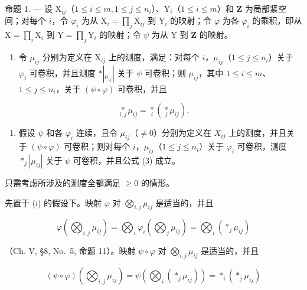 命题 1. --- 设 \(\mathrm{X}_{ij}\)（\(1 \leqslant i \leqslant m, 1 \leqslant j \leqslant n_i\)）、\(\mathrm{Y}_i\)（\(1 \leqslant i \leqslant m\)）和 \(\mathbf{Z}\) 为局部紧空间；对每个 \(i\)，令 \(\varphi_i\) 为从 \(\mathrm{X}_i = \prod_j \mathrm{X}_{ij}\) 到 \(\mathrm{Y}_i\) 的映射；令 \(\varphi\) 为各 \(\varphi_i\) 的乘积，即从 \(\mathrm{X} = \prod_i \mathrm{X}_i\) 到 \(\mathrm{Y} = \prod_j \mathrm{Y}_i\) 的映射；令 \(\psi\) 为从 \(\mathrm{Y}\) 到 \(\mathbf{Z}\) 的映射。

\begin{enumerate}
\def\labelenumi{(\roman{enumi})}
\tightlist
\item
  令 \(\mu_{ij}\) 分别为定义在 \(\mathrm{X}_{ij}\) 上的测度，满足：对每个 \(i\)，\(\mu_{ij}\)（\(1 \leqslant j \leqslant n_i\)）关于 \(\varphi_i\) 可卷积，并且测度 \(*|_{\mu_{ij}}|\) 关于 \(\psi\) 可卷积；则 \(\mu_{ij}\)，其中 \(1 \leqslant i \leqslant m\)、\(1 \leqslant j \leqslant n_i\)，关于 \((\psi \circ \varphi)\) 可卷积，并且
\end{enumerate}

\[
\underset {i, j} {\ast} \mu_ {i j} = \underset {i} {\ast} \left(\underset {j} {\ast} \mu_ {i j}\right).\tag{3}
\]

\begin{enumerate}
\def\labelenumi{(\roman{enumi})}
\setcounter{enumi}{1}
\tightlist
\item
  假设 \(\psi\) 和各 \(\varphi_{i}\) 连续，且令 \(\mu_{ij}\)（\(\neq 0\)）分别为定义在 \(X_{ij}\) 上的测度，并且关于 \((\psi \circ \varphi)\) 可卷积；则对每个 \(i\)，\(\mu_{ij}\)（\(1 \leqslant j \leqslant n_{i}\)）关于 \(\varphi_{i}\) 可卷积，测度 \(*_{j} |\mu_{ij}|\) 关于 \(\psi\) 可卷积，并且公式 (3) 成立。
\end{enumerate}

只需考虑所涉及的测度全都满足 \(\geqslant 0\) 的情形。

先置于 (i) 的假设下。映射 \(\varphi\) 对 \(\bigotimes_{i,j} \mu_{ij}\) 是适当的，并且

\[
\varphi \left(\bigotimes_ {i, j} \mu_ {i j}\right) = \bigotimes_ {i} \varphi_ {i} \left(\bigotimes_ {j} \mu_ {i j}\right) = \bigotimes_ {i} \left(* _ {j} \mu_ {i j}\right)
\]

（Ch. V, §8, No.~5, 命题 11）。映射 \(\psi \circ \varphi\) 对 \(\bigotimes_{i,j} \mu_{ij}\) 是适当的，并且

\[
(\psi \circ \varphi) \left(\bigotimes_ {i, j} \mu_ {i j}\right) = \psi \left(\bigotimes_ {i} \left(* _ {j} \mu_ {i j}\right)\right) = * _ {i} \left(* _ {j} \mu_ {i j}\right)
\]

